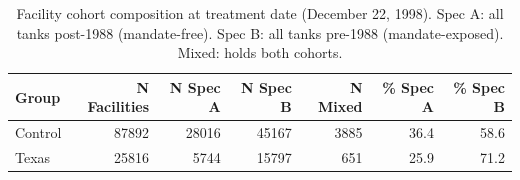 \begin{table}[!h]
\centering
\caption{\label{tab:tab:cohort-composition}Facility cohort composition at treatment date (December 22, 1998). Spec A: all tanks post-1988 (mandate-free). Spec B: all tanks pre-1988 (mandate-exposed). Mixed: holds both cohorts.}
\centering
\fontsize{10}{12}\selectfont
\begin{tabular}[t]{lrrrrrr}
\toprule
Group & N Facilities & N Spec A & N Spec B & N Mixed & \% Spec A & \% Spec B\\
\midrule
Control & 87892 & 28016 & 45167 & 3885 & 36.4 & 58.6\\
Texas & 25816 & 5744 & 15797 & 651 & 25.9 & 71.2\\
\bottomrule
\end{tabular}
\end{table}
